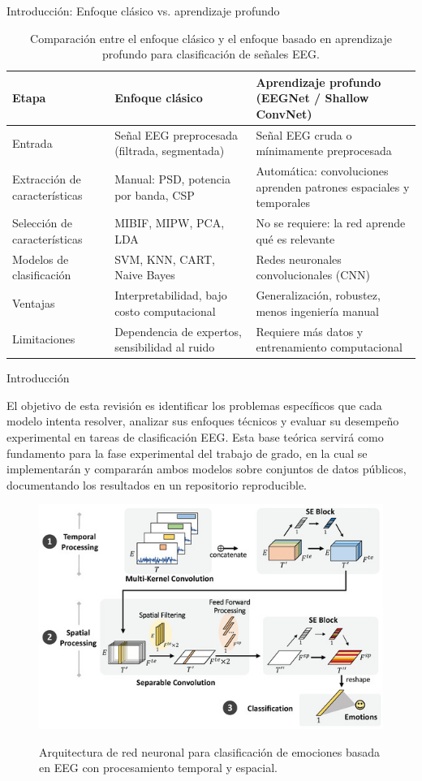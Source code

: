 \documentclass{beamer}
\begin{document}
\begin{frame}{Introducción: Enfoque clásico vs. aprendizaje profundo}
\scriptsize
\begin{table}[h]
\centering
\renewcommand{\arraystretch}{1.3}
\begin{tabular}{|p{2cm}|p{4cm}|p{4cm}|}
\hline
\textbf{Etapa} & \textbf{Enfoque clásico} & \textbf{Aprendizaje profundo (EEGNet / Shallow ConvNet)} \\
\hline
Entrada & Señal EEG preprocesada (filtrada, segmentada) & Señal EEG cruda o mínimamente preprocesada \\
\hline
Extracción de características & Manual: PSD, potencia por banda, CSP & Automática: convoluciones aprenden patrones espaciales y temporales \\
\hline
Selección de características & MIBIF, MIPW, PCA, LDA & No se requiere: la red aprende qué es relevante \\
\hline
Modelos de clasificación & SVM, KNN, CART, Naive Bayes & Redes neuronales convolucionales (CNN) \\
\hline
Ventajas & Interpretabilidad, bajo costo computacional & Generalización, robustez, menos ingeniería manual \\
\hline
Limitaciones & Dependencia de expertos, sensibilidad al ruido & Requiere más datos y entrenamiento computacional \\
\hline
\end{tabular}
\caption{Comparación entre el enfoque clásico y el enfoque basado en aprendizaje profundo para clasificación de señales EEG.}
\end{table}
\end{frame}



\begin{frame}{Introducción}

El objetivo de esta revisión es identificar los problemas específicos que cada modelo intenta resolver, analizar sus enfoques técnicos y evaluar su desempeño experimental en tareas de clasificación EEG. Esta base teórica servirá como fundamento para la fase experimental del trabajo de grado, en la cual se implementarán y compararán ambos modelos sobre conjuntos de datos públicos, documentando los resultados en un repositorio reproducible.

\begin{figure}[h]
    \centering
    \href{https://www.mdpi.com/1424-8220/22/21/8250}{%
        \includegraphics[width=0.43\linewidth]{temporalprocessing.jpg}%
    }
    \caption{\small Arquitectura de red neuronal para clasificación de emociones basada en EEG con procesamiento temporal y espacial.}
    \label{fig:eeg_models}
\end{figure}

\end{frame}
\end{document}

